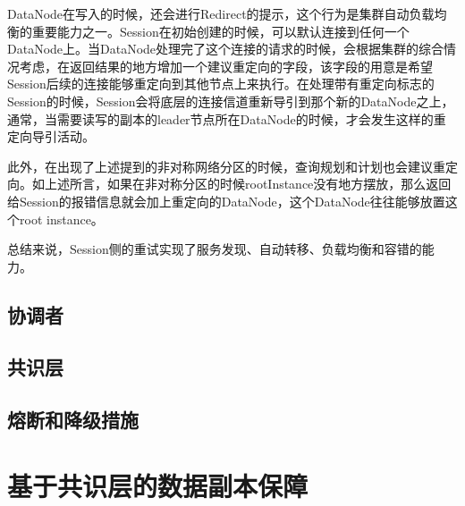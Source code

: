 DataNode在写入的时候，还会进行Redirect的提示，这个行为是集群自动负载均衡的重要能力之一。Session在初始创建的时候，可以默认连接到任何一个DataNode上。当DataNode处理完了这个连接的请求的时候，会根据集群的综合情况考虑，在返回结果的地方增加一个建议重定向的字段，该字段的用意是希望Session后续的连接能够重定向到其他节点上来执行。在处理带有重定向标志的Session的时候，Session会将底层的连接信道重新导引到那个新的DataNode之上，通常，当需要读写的副本的leader节点所在DataNode的时候，才会发生这样的重定向导引活动。

此外，在出现了上述提到的非对称网络分区的时候，查询规划和计划也会建议重定向。如上述所言，如果在非对称分区的时候rootInstance没有地方摆放，那么返回给Session的报错信息就会加上重定向的DataNode，这个DataNode往往能够放置这个root instance。


总结来说，Session侧的重试实现了服务发现、自动转移、负载均衡和容错的能力。



\subsection{协调者}




\subsection{共识层}


\subsection{熔断和降级措施}


\section{基于共识层的数据副本保障}
